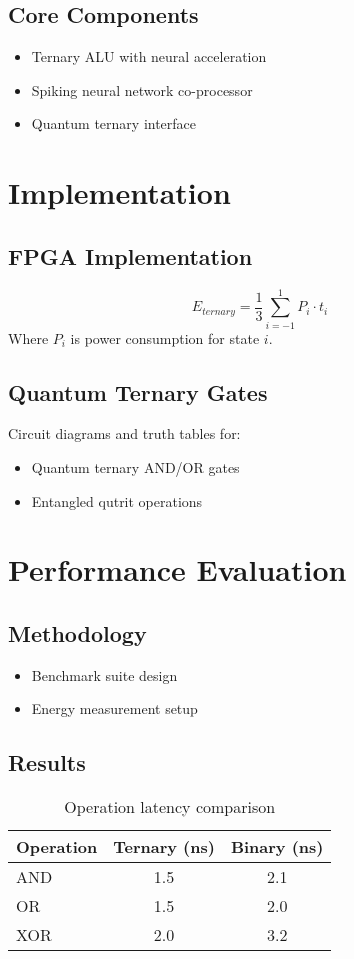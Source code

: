 \documentclass[12pt]{article}
\begin{document}
\subsection{Core Components}
\begin{itemize}
\item Ternary ALU with neural acceleration
\item Spiking neural network co-processor
\item Quantum ternary interface
\end{itemize}

\section{Implementation}
\subsection{FPGA Implementation}
\begin{equation}
E_{ternary} = \frac{1}{3} \sum_{i=-1}^{1} P_i \cdot t_i
\end{equation}
Where $P_i$ is power consumption for state $i$.

\subsection{Quantum Ternary Gates}
Circuit diagrams and truth tables for:
\begin{itemize}
\item Quantum ternary AND/OR gates
\item Entangled qutrit operations
\end{itemize}

\section{Performance Evaluation}
\subsection{Methodology}
\begin{itemize}
\item Benchmark suite design
\item Energy measurement setup
\end{itemize}

\subsection{Results}
\begin{table}[h]
\centering
\begin{tabular}{|l|c|c|}
\hline
Operation & Ternary (ns) & Binary (ns) \\
\hline
AND & 1.5 & 2.1 \\
OR & 1.5 & 2.0 \\
XOR & 2.0 & 3.2 \\
\hline
\end{tabular}
\caption{Operation latency comparison}
\end{table}
\end{document}
